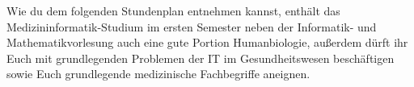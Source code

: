 Wie du dem folgenden Stundenplan entnehmen kannst, enthält das Medizininformatik-Studium im ersten Semester neben der Informatik- und Mathematikvorlesung auch eine gute Portion Humanbiologie, außerdem dürft ihr Euch mit grundlegenden Problemen der IT im Gesundheitswesen beschäftigen sowie Euch grundlegende medizinische Fachbegriffe aneignen.\\
\noindent\makebox[\textwidth][c]{%
	\setlength{\fboxrule}{4pt}
	\fcolorbox{red}{white}{
		\begin{minipage}[t]{
			\textwidth}\textbf{Achtung!} Die Daten für die Vorlesungstermine können sich noch ändern. Schau am besten auf Alma (\url{https://alma.uni-tuebingen.de}), ob die Termine dort geupdatet wurden.
		\end{minipage}}}

